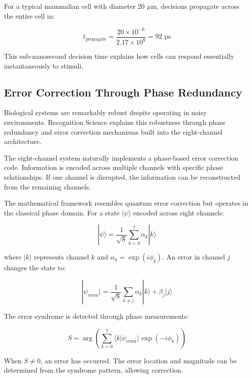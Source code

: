 \documentclass[12pt,a4paper]{report}
\begin{document}
For a typical mammalian cell with diameter 20 $\mu$m, decisions propagate across the entire cell in:

\begin{equation}
t_{\text{propagate}} = \frac{20 \times 10^{-6}}{2.17 \times 10^8} = 92 \text{ ps}
\end{equation}

This sub-nanosecond decision time explains how cells can respond essentially instantaneously to stimuli.

\subsection{Error Correction Through Phase Redundancy}

Biological systems are remarkably robust despite operating in noisy environments. Recognition Science explains this robustness through phase redundancy and error correction mechanisms built into the eight-channel architecture.

The eight-channel system naturally implements a phase-based error correction code. Information is encoded across multiple channels with specific phase relationships. If one channel is disrupted, the information can be reconstructed from the remaining channels.

The mathematical framework resembles quantum error correction but operates in the classical phase domain. For a state $|\psi\rangle$ encoded across eight channels:

\begin{equation}
|\psi\rangle = \frac{1}{\sqrt{8}} \sum_{k=0}^{7} \alpha_k |k\rangle
\end{equation}

where $|k\rangle$ represents channel $k$ and $\alpha_k = \exp(i\phi_k)$. An error in channel $j$ changes the state to:

\begin{equation}
|\psi_{\text{error}}\rangle = \frac{1}{\sqrt{8}} \sum_{k \neq j} \alpha_k |k\rangle + \beta_j |j\rangle
\end{equation}

The error syndrome is detected through phase measurements:

\begin{equation}
S = \arg\left(\sum_{k=0}^{7} \langle k|\psi_{\text{error}}\rangle \exp(-i\phi_k)\right)
\end{equation}

When $S \neq 0$, an error has occurred. The error location and magnitude can be determined from the syndrome pattern, allowing correction.
\end{document}
